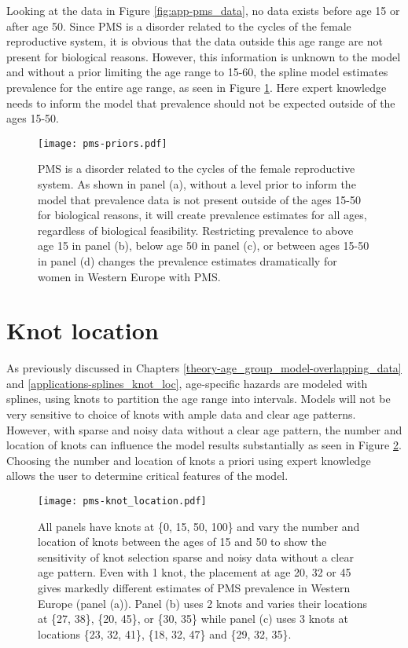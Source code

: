 Looking at the data in Figure \ref{fig:app-pms_data}, no data exists before age 15 or after age 50.  Since PMS is a disorder related to the cycles of the female reproductive system, it is obvious that the data outside this age range are not present for biological reasons.  However, this information is unknown to the model and without a prior limiting the age range to 15-60, the spline model estimates prevalence for the entire age range, as seen in Figure \ref{fig:app-prios_on_level}.  Here expert knowledge needs to inform the model that prevalence should not be expected outside of the ages 15-50.

    \begin{figure}
        \begin{center}
            \texttt{[image: pms-priors.pdf]}
        \end{center}
        \caption{PMS is a disorder related to the cycles of the female reproductive system.  As shown in panel (a), without a level prior to inform the model that prevalence data is not present outside of the ages 15-50 for biological reasons, it will create prevalence estimates for all ages, regardless of biological feasibility.  Restricting prevalence to above age 15 in panel (b), below age 50 in panel (c), or between ages 15-50 in panel (d) changes the prevalence estimates dramatically for women in Western Europe with PMS.}
        \label{fig:app-prios_on_level}
    \end{figure}

\section{Knot location}
As previously discussed in Chapters \ref{theory-age_group_model-overlapping_data} and \ref{applications-splines_knot_loc}, age-specific hazards are modeled with splines, using knots to partition the age range into intervals.  Models will not be very sensitive to choice of knots with ample data and clear age patterns.  However, with sparse and noisy data without a clear age pattern, the number and location of knots can influence the model results substantially as seen in Figure \ref{fig:app-knot_loc}.  Choosing the number and location of knots a priori using expert knowledge allows the user to determine critical features of the model.

    \begin{figure}
        \begin{center}
            \texttt{[image: pms-knot\_location.pdf]}
        \end{center}
        \caption{All panels have knots at \{0, 15, 50, 100\} and vary the number and location of knots between the ages of 15 and 50 to show the sensitivity of knot selection sparse and noisy data without a clear age pattern. Even with 1 knot, the placement at age 20, 32 or 45 gives markedly different estimates of PMS prevalence in Western Europe (panel (a)).  Panel (b) uses 2 knots and varies their locations at \{27, 38\}, \{20, 45\}, or \{30, 35\} while panel (c) uses 3 knots at locations \{23, 32, 41\}, \{18, 32, 47\} and \{29, 32, 35\}.}
        \label{fig:app-knot_loc}
    \end{figure}

